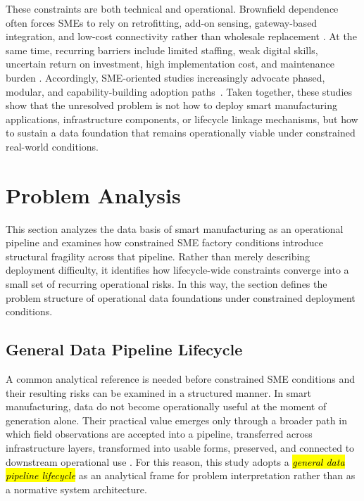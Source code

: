 \documentclass[systems,article,accept,pdftex,moreauthors]{Definitions/mdpi}
\begin{document}
These constraints are both technical and operational. Brownfield dependence often forces SMEs to rely on retrofitting, add-on sensing, gateway-based integration, and low-cost connectivity rather than wholesale replacement \cite{alqoud2022legacy, etz2020retrofit, tran2022retrofitting, park2019opcua}. At the same time, recurring barriers include limited staffing, weak digital skills, uncertain return on investment, high implementation cost, and maintenance burden \cite{huang2025barriers, narwane2022examining, kumar2025digitalization, hulla2021towards}. Accordingly, SME-oriented studies increasingly advocate phased, modular, and capability-building adoption \mbox{paths \cite{chavez2020capability, krishnan2024challenges, banerjee2024lowcost}}. Taken together, these studies show that the unresolved problem is not how to deploy smart manufacturing applications, infrastructure components, or lifecycle linkage mechanisms, but how to sustain a data foundation that remains operationally viable under constrained real-world conditions.

\section{Problem Analysis}
\label{sec:problem_analysis}

This section analyzes the data basis of smart manufacturing as an operational pipeline and examines how constrained SME factory conditions introduce structural fragility across that pipeline. Rather than merely describing deployment difficulty, it identifies how lifecycle-wide constraints converge into a small set of recurring operational risks. In this way, the section defines the problem structure of operational data foundations under constrained deployment conditions.

\subsection{General Data Pipeline Lifecycle}
\label{sec:data_lifecycle}


A common analytical reference is needed before constrained SME conditions and their resulting risks can be examined in a structured manner. In smart manufacturing, data do not become operationally useful at the moment of generation alone. Their practical value emerges only through a broader path in which field observations are accepted into a pipeline, transferred across infrastructure layers, transformed into usable forms, preserved, and connected to downstream operational use \cite{ismail2019manufacturing,raptis2019data}. For this reason, this study adopts a \emph{\hl{general data pipeline lifecycle}} as an analytical frame for problem interpretation rather than as a normative system architecture.
\end{document}

